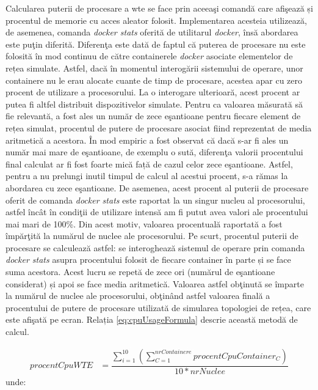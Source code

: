 Calcularea puterii de procesare a \gls{wte} se face prin aceeaşi comandă care afişează și procentul de memorie cu acces aleator folosit. Implementarea acesteia utilizează, de asemenea, comanda \textit{docker stats} oferită de utilitarul \textit{docker}, însă abordarea este puţin diferită. Diferenţa este dată de faptul că puterea de procesare nu este folosită în mod continuu de către containerele \textit{docker} asociate elementelor de rețea simulate. Astfel, dacă în momentul interogării sistemului de operare, unor containere nu le erau alocate cuante de timp de procesare, acestea apar cu zero procent de utilizare a procesorului. La o interogare ulterioară, acest procent ar putea fi altfel distribuit dispozitivelor simulate. Pentru ca valoarea măsurată să fie relevantă, a fost ales un număr de zece eşantioane pentru fiecare element de rețea simulat, procentul de putere de procesare asociat fiind reprezentat de media aritmetică a acestora. În mod empiric a fost observat că dacă s-ar fi ales un număr mai mare de eşantioane, de exemplu o sută, diferenţa valorii procentului final calculat ar fi fost foarte mică față de cazul celor zece eşantioane. Astfel, pentru a nu prelungi inutil timpul de calcul al acestui procent, s-a rămas la abordarea cu zece eşantioane. De asemenea, acest procent al puterii de procesare oferit de comanda \textit{docker stats} este raportat la un singur nucleu al procesorului, astfel încât în condiţii de utilizare intensă am fi putut avea valori ale procentului mai mari de 100\%. Din acest motiv, valoarea procentuală raportată a fost împărţită la numărul de nuclee ale procesorului. Pe scurt, procentul puterii de procesare se calculează astfel: se interoghează sistemul de operare prin comanda \textit{docker stats} asupra procentului folosit de fiecare container în parte și se face suma acestora. Acest lucru se repetă de zece ori (numărul de eşantioane considerat) și apoi se face media aritmetică. Valoarea astfel obţinută se împarte la numărul de nuclee ale procesorului, obţinând astfel valoarea finală a procentului de putere de procesare utilizată de simularea topologiei de rețea, care este afişată pe ecran. Relația \ref{eq:cpuUsageFormula} descrie această metodă de calcul.

\begin{equation}\label{eq:cpuUsageFormula}
\begin{split}
procentCpuWTE& = \dfrac{\sum_{i=1}^{10} (\sum_{C=1}^{nrContainere} procentCpuContainer_C)}{10 * nrNuclee}
\end{split}
\end{equation}
unde:

